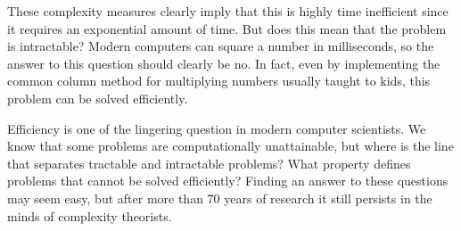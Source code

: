These complexity measures clearly imply that this \TM is highly time inefficient since it requires an exponential amount of time. But does this mean that the problem is intractable? Modern computers can square a number in milliseconds, so the answer to this question should clearly be no. In fact, even by implementing the common column method for multiplying numbers usually taught to kids, this problem can be solved efficiently.

Efficiency is one of the lingering question in modern computer scientists. We know that some problems are computationally unattainable, but where is the line that separates tractable and intractable problems? What property defines problems that cannot be solved efficiently? Finding an answer to these questions may seem easy, but after more than 70 years of research it still persists in the minds of complexity theorists.
